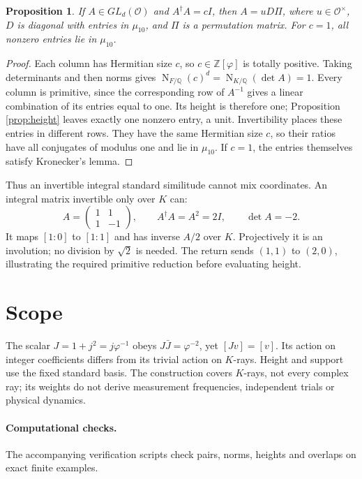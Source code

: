 \documentclass[11pt,a4paper]{article}
\newtheorem{proposition}{Proposition}
\newcommand{\Z}{\mathbb Z}
\newcommand{\Q}{\mathbb Q}
\newcommand{\OO}{\mathcal O}
\newcommand{\ph}{\varphi}
\newcommand{\Nm}{\operatorname{N}}
\begin{document}
\begin{proposition}\label{prop:rigidity}
If $A\in GL_d(\OO)$ and $A^\dagger A=cI$, then $A=uD\Pi$,
where $u\in\OO^\times$, $D$ is diagonal with entries in
$\mu_{10}$, and $\Pi$ is a permutation matrix.
For $c=1$, all nonzero entries lie in $\mu_{10}$.
\end{proposition}
\begin{proof}
Each column has Hermitian size $c$, so $c\in\Z[\ph]$ is totally
positive. Taking determinants and then norms gives
$\Nm_{F/\Q}(c)^d=\Nm_{K/\Q}(\det A)=1$.
Every column is primitive, since the corresponding row of $A^{-1}$
gives a linear combination of its entries equal to one.
Its height is therefore one; Proposition \ref{prop:height} leaves
exactly one nonzero entry, a unit. Invertibility places these entries
in different rows. They have the same Hermitian size $c$, so their
ratios have all conjugates of modulus one and lie in $\mu_{10}$.
If $c=1$, the entries themselves satisfy Kronecker's lemma.
\end{proof}

Thus an invertible integral standard similitude cannot mix coordinates.
An integral matrix invertible only over $K$ can:
\begin{equation}\label{eq:hadamard}
 A=\begin{pmatrix}1&1\\1&-1\end{pmatrix},\qquad
 A^\dagger A=A^2=2I,\qquad \det A=-2.
\end{equation}
It maps $[1:0]$ to $[1:1]$ and has inverse $A/2$ over $K$.
Projectively it is an involution; no division by $\sqrt2$ is needed.
The return sends $(1,1)$ to $(2,0)$, illustrating the required
primitive reduction before evaluating height.

\section{Scope}\label{sec:scope}
The scalar $J=1+j^2=j\ph^{-1}$ obeys $J\bar J=\ph^{-2}$,
yet $[Jv]=[v]$. Its action on integer coefficients differs from its
trivial action on $K$-rays. Height and support use the fixed standard
basis. The construction covers $K$-rays, not every complex ray;
its weights do not derive measurement frequencies, independent trials
or physical dynamics.

\paragraph{Computational checks.}
The accompanying verification scripts check pairs, norms, heights
and overlaps on exact finite examples.
\end{document}

